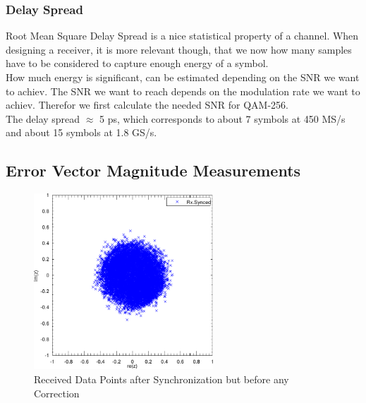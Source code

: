 \subsubsection{Delay Spread}
Root Mean Square Delay Spread is a nice statistical property of a channel.
When designing a receiver, it is more relevant though, that we now how many
samples have to be considered to capture enough energy of a symbol. \\

How much energy is significant, can be estimated depending on the \gls{SNR}
we want to achiev. The \gls{SNR} we want to reach depends on the modulation rate
we want to achiev. Therefor we first calculate the needed \gls{SNR} for
\gls{QAM}-256. \\

The delay spread $\approx $ 5 ps, which corresponds to about 7 symbols
at 450 MS/s and about 15 symbols at 1.8 GS/s. \\


\subsection{Error Vector Magnitude Measurements}
\begin{figure}[p]
  \centering
  \includegraphics[width=0.6\textwidth]{figures/matlab/res_450_cp_synced}
  \caption{Received Data Points after Synchronization but before any Correction}
  \label{fig:res_450_cp_synced}
\end{figure}

